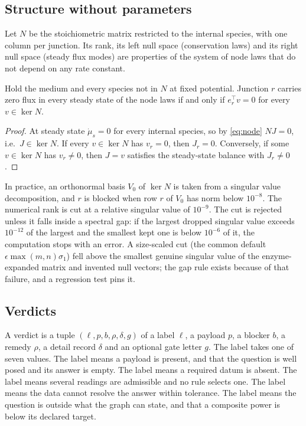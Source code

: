 \subsection{Structure without parameters}
\label{sec:structure}

Let $N$ be the stoichiometric matrix restricted to the internal species, with one column per junction.
Its rank, its left null space (conservation laws) and its right null space (steady flux modes) are properties of the system of node laws that do not depend on any rate constant.

\begin{proposition}
\label{prop:blocked}
Hold the medium and every species not in $N$ at fixed potential.
Junction $r$ carries zero flux in every steady state of the node laws if and only if $e_r^{\top} v = 0$ for every $v\in\ker N$.
\end{proposition}
\begin{proof}
At steady state $\dot\mu_s=0$ for every internal species, so by \cref{eq:node} $NJ=0$, i.e.\ $J\in\ker N$.
If every $v\in\ker N$ has $v_r=0$, then $J_r=0$.
Conversely, if some $v\in\ker N$ has $v_r\neq0$, then $J=v$ satisfies the steady-state balance with $J_r\neq0$.
\end{proof}

In practice, an orthonormal basis $V_0$ of $\ker N$ is taken from a singular value decomposition, and $r$ is blocked when row $r$ of $V_0$ has norm below $10^{-8}$.
The numerical rank is cut at a relative singular value of $10^{-9}$.
The cut is rejected unless it falls inside a spectral gap: if the largest dropped singular value exceeds $10^{-12}$ of the largest and the smallest kept one is below $10^{-6}$ of it, the computation stops with an error.
A size-scaled cut (the common default $\epsilon\max(m,n)\sigma_1$) fell above the smallest genuine singular value of the enzyme-expanded matrix and invented null vectors; the gap rule exists because of that failure, and a regression test pins it.

\subsection{Verdicts}
\label{sec:verdicts}

\begin{definition}[Verdict]
\label{def:verdict}
A verdict is a tuple $(\ell, p, b, \rho, \delta, g)$ of a label $\ell$, a payload $p$, a blocker $b$, a remedy $\rho$, a detail record $\delta$ and an optional gate letter $g$.
The label takes one of seven values.
The label  means a payload is present, and  that the question is well posed and its answer is empty.
The label  means a required datum is absent.
The label  means several readings are admissible and no rule selects one.
The label  means the data cannot resolve the answer within tolerance.
The label  means the question is outside what the graph can state, and  that a composite power is below its declared target.
\end{definition}


